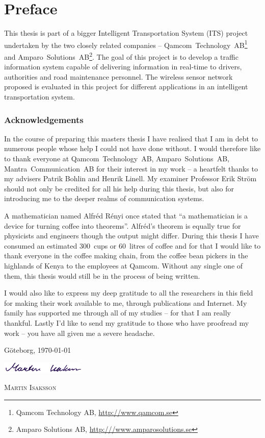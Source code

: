 \cleardoublepage\chapter*{Preface}
\thispagestyle{plain}
This thesis is part of a bigger Intelligent Transportation System (ITS) project undertaken by the two closely related companies -- \mbox{Qamcom~Technology~AB}\footnote{Qamcom Technology AB, \url{http://www.qamcom.se}} and \mbox{Amparo~Solutions~AB}\footnote{Amparo Solutions AB, \url{http:///www.amparosolutions.se}}. The goal of this project is to develop a traffic information system capable of delivering information in real-time to drivers, authorities and road maintenance personnel. The wireless sensor network proposed is evaluated in this project for different applications in an intelligent transportation system.
\subsection*{Acknowledgements}
In the course of preparing this masters thesis I have realised that I am in debt to numerous people whose help I could not have done without. I would therefore like to thank everyone at Qamcom~Technology~AB, Amparo~Solutions~AB, Mantra~Communication~AB for their interest in my work -- a heartfelt thanks to my advisers Patrik Bohlin and Henrik Linell. My examiner Professor Erik Str\"{o}m should not only be credited for all his help during this thesis, but also for introducing me to the deeper realms of communication systems. 

A mathematician named Alfr\'{e}d R\'{e}nyi once stated that ``a mathematician is a device for turning coffee into theorems''. Alfr\'{e}d's theorem is equally true for physicists and engineers though the output might differ. During this thesis I have consumed an estimated \mbox{300 cups} or \mbox{60 litres} of coffee and for that I would like to thank everyone in the coffee making chain, from the coffee bean pickers in the highlands of Kenya to the employees at Qamcom. Without any single one of them, this thesis would still be in the process of being written.

I would also like to express my deep gratitude to all the researchers in this field for making their work available to me, through publications and Internet. My family has supported me through all of my studies -- for that I am really thankful. Lastly I'd like to send my gratitude to those who have proofread my work -- you have all given me a severe headache.

\vspace{0.5cm}

\hspace{9.5cm}\parbox[t]{6 cm}{
G\"{o}teborg, \today

\vspace{0.5cm}

\includegraphics[width=4cm]{images/signature.eps}

\vspace{0.5cm}

\textsc{Martin Isaksson}
}
\thispagestyle{empty}

\newpage
